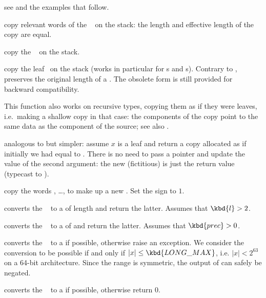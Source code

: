  see  and the examples that
follow.


 copy relevant words of the ~ on the
stack: the length and effective length of the copy are equal.

 copy the ~ on the stack.

 copy the leaf~ on the
stack (works in particular for s and s).
Contrary to ,  preserves the original
length of a . The obsolete form 
is still provided for backward compatibility.

This function also works on recursive types, copying them as if they were
leaves, i.e.~making a shallow copy in that case: the components of the copy
point to the same data as the component of the source; see also
.

 analogous to 
but simpler: assume $x$ is a leaf and return a copy allocated as if
initially we had  equal to . There is no need to pass a
pointer and update the value of the second argument: the new (fictitious)
 is just the return value (typecast to ).

 copy the  words
, \dots,  to make up a new . Set the sign
to $1$.


 converts the ~ to a
 of length  and return the latter.
Assumes that $\kbd{l} > 2$.

 converts the ~ to a
 of  and return the latter. Assumes that $\kbd{prec} > 0$.

 converts the ~ to a  if
possible, otherwise raise an exception. We consider the conversion
to be possible if and only if $|x| \leq \kbd{LONG\_MAX}$, i.e. $|x| < 2^{63}$
on a 64-bit architecture. Since the range is symmetric, the output of
 can safely be negated.

 converts the ~ to a  if
possible, otherwise return $0$.

